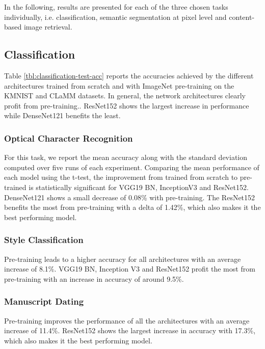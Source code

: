 \documentclass[journal]{IEEEtran}
\newcommand{\af}[1]{{\color{black}#1}}
\newcommand{\ls}[1]{{\color{black}#1}}
\begin{document}
\af{In the following, results are presented for each of the three chosen tasks individually, i.e. classification, semantic segmentation at pixel level and content-based image retrieval.}

\subsection{Classification}
Table \ref{tbl:classification-test-acc} reports the accuracies achieved by the different architectures trained from scratch and with ImageNet pre-training on the \af{\ac{KMNIST} and \ac{CLaMM} datasets}. \af{In general, the network architectures clearly profit from pre-training.}. \ls{ResNet152 shows the \af{largest} increase in performance while DenseNet121 benefits the least.}

\subsubsection{Optical Character Recognition}
For this task, we report the mean accuracy along with the standard deviation computed over five runs of each experiment. 
Comparing the mean performance of each model using the t-test, the improvement from trained from scratch to pre-trained is statistically significant for VGG19 BN, InceptionV3 and ResNet152.
\ls{DenseNet121 shows a small decrease of 0.08\% with pre-training.
The ResNet152 benefits the most from pre-training with a delta of 1.42\%, which also makes it the best performing model.}

\subsubsection{Style Classification}
Pre-training leads to a higher accuracy for all architectures with an average increase of 8.1\%. \ls{VGG19 BN, Inception V3 and ResNet152 profit the most from pre-training with an increase in accuracy of around 9.5\%.}

\subsubsection{Manuscript Dating}
\ls{Pre-training \af{improves} the performance of all the architectures with an average increase of 11.4\%.
ResNet152 shows the largest increase in accuracy with 17.3\%, which also makes it the best performing model.}
\end{document}
